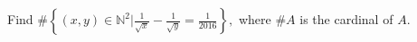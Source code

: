 Find $ \#\left\{ (x,y)\in\mathbb{N}^2\bigg| \frac{1}{\sqrt{x}} -\frac{1}{\sqrt{y}} =\frac{1}{2016}\right\} , $ where $ \# A $ is the cardinal of $ A . $